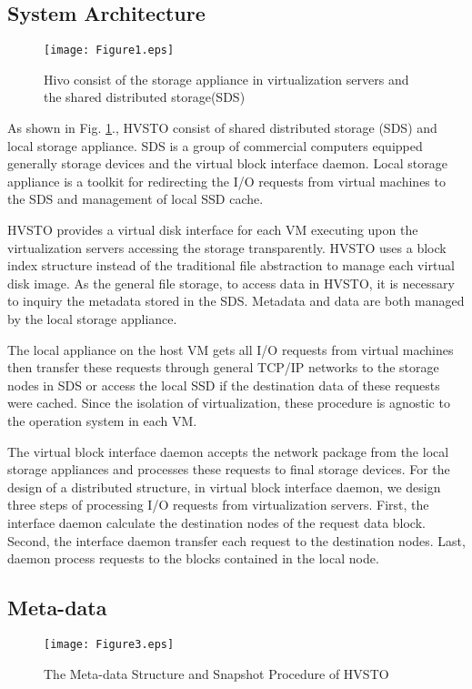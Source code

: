 \documentclass[conference]{IEEEtran}
\begin{document}
\subsection{System Architecture}

\begin{figure}[!ht]
\centering
\texttt{[image: Figure1.eps]}
\caption{Hivo consist of the storage appliance in virtualization servers and the shared distributed storage(SDS)}
\label{figure:HVSTO}
\end{figure}
As shown in Fig. \ref{figure:HVSTO}., HVSTO consist of shared distributed storage (SDS) and local storage appliance. SDS is a group of commercial computers equipped generally storage devices and the virtual block interface daemon. Local storage appliance is a toolkit for redirecting the I/O requests from virtual machines to the SDS and management of local SSD cache.

HVSTO provides a virtual disk interface for each VM executing upon the virtualization servers accessing the storage transparently. HVSTO uses a block index structure instead of the traditional file abstraction to manage each virtual disk image. As the general file storage, to access data in HVSTO, it is necessary to inquiry the metadata stored in the SDS. Metadata and data are both managed by the local storage appliance.

The local appliance on the host VM gets all I/O requests from virtual machines then transfer these requests through general TCP/IP networks to the storage nodes in SDS or access the local SSD if the destination data of these requests were cached. Since the isolation of virtualization, these procedure is agnostic to the operation system in each VM.

The virtual block interface daemon accepts the network package from the local storage appliances and processes these requests to final storage devices. For the design of a distributed structure, in virtual block interface daemon, we design three steps of processing I/O requests from virtualization servers. First, the interface daemon calculate the destination nodes of the request data block. Second, the interface daemon transfer each request to the destination nodes. Last, daemon process requests to the blocks contained in the local node.


\subsection{Meta-data}
\begin{figure}[!ht]
\centering
\texttt{[image: Figure3.eps]}
\caption{The Meta-data Structure and Snapshot Procedure of HVSTO}
\label{figure:metadata}
\end{figure}
\end{document}

